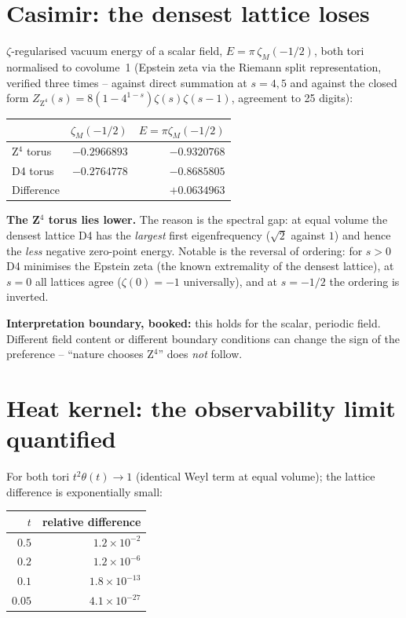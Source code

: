\section{Casimir: the densest lattice loses}

$\zeta$-regularised vacuum energy of a scalar field,
$E = \pi\,\zeta_M(-1/2)$, both tori normalised to covolume~1
(Epstein zeta via the Riemann split representation, verified three
times -- against direct summation at $s = 4, 5$ and against the
closed form
$Z_{\text{Z}^4}(s) = 8(1-4^{1-s})\zeta(s)\zeta(s-1)$, agreement to
25 digits):

\begin{center}
\begin{tabular}{lrr}
\toprule
 & $\zeta_M(-1/2)$ & $E = \pi\zeta_M(-1/2)$ \\
\midrule
Z$^4$ torus & $-0.2966893$ & $-0.9320768$ \\
D4 torus & $-0.2764778$ & $-0.8685805$ \\
\midrule
Difference & & $+0.0634963$ \\
\bottomrule
\end{tabular}
\end{center}

\textbf{The Z$^4$ torus lies lower.} The reason is the spectral gap:
at equal volume the densest lattice D4 has the \emph{largest} first
eigenfrequency ($\sqrt2$ against $1$) and hence the \emph{less}
negative zero-point energy. Notable is the reversal of ordering: for
$s > 0$ D4 minimises the Epstein zeta (the known extremality of the
densest lattice), at $s = 0$ all lattices agree
($\zeta(0) = -1$ universally), and at $s = -1/2$ the ordering is
inverted.

\textbf{Interpretation boundary, booked:} this holds for the scalar,
periodic field. Different field content or different boundary
conditions can change the sign of the preference --
\enquote{nature chooses Z$^4$} does \emph{not} follow.

\section{Heat kernel: the observability limit quantified}

For both tori $t^2\theta(t) \to 1$ (identical Weyl term at equal
volume); the lattice difference is exponentially small:

\begin{center}
\begin{tabular}{rr}
\toprule
$t$ & relative difference \\
\midrule
$0.5$ & $1.2\times10^{-2}$ \\
$0.2$ & $1.2\times10^{-6}$ \\
$0.1$ & $1.8\times10^{-13}$ \\
$0.05$ & $4.1\times10^{-27}$ \\
\bottomrule
\end{tabular}
\end{center}

